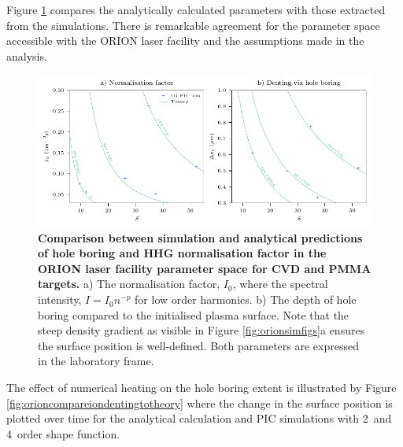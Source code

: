 Figure \ref{fig:orioncombinedi0ds} compares the analytically calculated parameters with those extracted from the simulations. There is remarkable agreement for the parameter space accessible with the ORION laser facility and the assumptions made in the analysis.
\begin{figure}
	\centering
	\includegraphics{figures/orion/orion_combined_I0_ds}
	\caption[Comparison between simulation and analytical predictions of hole boring and HHG normalisation factor.]{\textbf{Comparison between simulation and analytical predictions of hole boring and HHG normalisation factor in the ORION laser facility parameter space for CVD and PMMA targets.} a) The normalisation factor, $I_0$, where the spectral intensity, $I = I_0 n^{-p}$ for low order harmonics. b) The depth of hole boring compared to the initialised plasma surface. Note that the steep density gradient as visible in Figure \ref{fig:orionsimfigs}a ensures the surface position is well-defined. Both parameters are expressed in the laboratory frame.}
	\label{fig:orioncombinedi0ds}
\end{figure}
The effect of numerical heating on the hole boring extent is illustrated by Figure \ref{fig:orioncompareiondentingtotheory} where the change in the surface position is plotted over time for the analytical calculation and PIC simulations with 2\nd\ and 4\th\ order shape function. 
